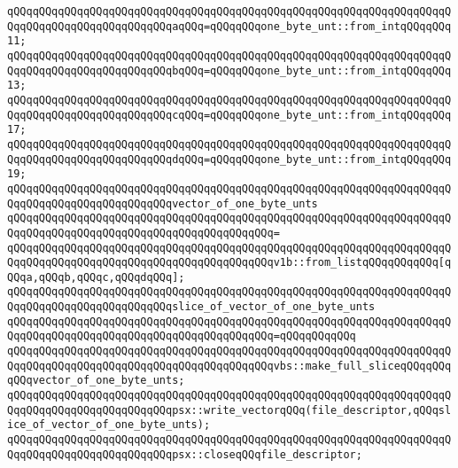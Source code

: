 \newline
\verb|qQQqqQQqqQQqqQQqqQQqqQQqqQQqqQQqqQQqqQQqqQQqqQQqqQQqqQQqqQQqqQQqqQQqqQQqqQQqqQQqqQQqqQQqqQQqqQQqaqQQq=qQQqqQQqone_byte_unt::from_intqQQqqQQq11;|\newline
\verb|qQQqqQQqqQQqqQQqqQQqqQQqqQQqqQQqqQQqqQQqqQQqqQQqqQQqqQQqqQQqqQQqqQQqqQQqqQQqqQQqqQQqqQQqqQQqqQQqbqQQq=qQQqqQQqone_byte_unt::from_intqQQqqQQq13;|\newline
\verb|qQQqqQQqqQQqqQQqqQQqqQQqqQQqqQQqqQQqqQQqqQQqqQQqqQQqqQQqqQQqqQQqqQQqqQQqqQQqqQQqqQQqqQQqqQQqqQQqcqQQq=qQQqqQQqone_byte_unt::from_intqQQqqQQq17;|\newline
\verb|qQQqqQQqqQQqqQQqqQQqqQQqqQQqqQQqqQQqqQQqqQQqqQQqqQQqqQQqqQQqqQQqqQQqqQQqqQQqqQQqqQQqqQQqqQQqqQQqdqQQq=qQQqqQQqone_byte_unt::from_intqQQqqQQq19;|\newline
\newline
\verb|qQQqqQQqqQQqqQQqqQQqqQQqqQQqqQQqqQQqqQQqqQQqqQQqqQQqqQQqqQQqqQQqqQQqqQQqqQQqqQQqqQQqqQQqqQQqqQQqvector_of_one_byte_unts|\newline
\verb|qQQqqQQqqQQqqQQqqQQqqQQqqQQqqQQqqQQqqQQqqQQqqQQqqQQqqQQqqQQqqQQqqQQqqQQqqQQqqQQqqQQqqQQqqQQqqQQqqQQqqQQqqQQqqQQq=|\newline
\verb|qQQqqQQqqQQqqQQqqQQqqQQqqQQqqQQqqQQqqQQqqQQqqQQqqQQqqQQqqQQqqQQqqQQqqQQqqQQqqQQqqQQqqQQqqQQqqQQqqQQqqQQqqQQqqQQqv1b::from_listqQQqqQQqqQQq[qQQqa,qQQqb,qQQqc,qQQqdqQQq];|\newline
\newline
\verb|qQQqqQQqqQQqqQQqqQQqqQQqqQQqqQQqqQQqqQQqqQQqqQQqqQQqqQQqqQQqqQQqqQQqqQQqqQQqqQQqqQQqqQQqqQQqqQQqslice_of_vector_of_one_byte_unts|\newline
\verb|qQQqqQQqqQQqqQQqqQQqqQQqqQQqqQQqqQQqqQQqqQQqqQQqqQQqqQQqqQQqqQQqqQQqqQQqqQQqqQQqqQQqqQQqqQQqqQQqqQQqqQQqqQQqqQQq=qQQqqQQqqQQq|\newline
\verb|qQQqqQQqqQQqqQQqqQQqqQQqqQQqqQQqqQQqqQQqqQQqqQQqqQQqqQQqqQQqqQQqqQQqqQQqqQQqqQQqqQQqqQQqqQQqqQQqqQQqqQQqqQQqqQQqvbs::make_full_sliceqQQqqQQqqQQqvector_of_one_byte_unts;|\newline
\newline
\newline
\verb|qQQqqQQqqQQqqQQqqQQqqQQqqQQqqQQqqQQqqQQqqQQqqQQqqQQqqQQqqQQqqQQqqQQqqQQqqQQqqQQqqQQqqQQqqQQqqQQqpsx::write_vectorqQQq(file_descriptor,qQQqslice_of_vector_of_one_byte_unts);|\newline
\newline
\verb|qQQqqQQqqQQqqQQqqQQqqQQqqQQqqQQqqQQqqQQqqQQqqQQqqQQqqQQqqQQqqQQqqQQqqQQqqQQqqQQqqQQqqQQqqQQqqQQqpsx::closeqQQqfile_descriptor;|\newline
